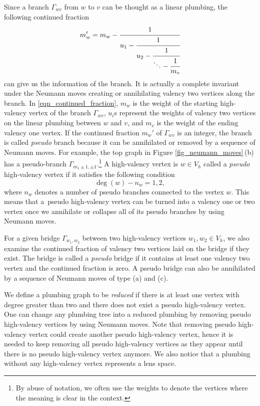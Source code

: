 Since a branch $ \Gamma_{wv} $ from $ w $ to $ v $ can be thought as a linear plumbing, the following continued fraction
\begin{equation}\label{eqn_continued_fraction}
	m_w'=m_w-\cfrac{1}{u_1-\cfrac{1}{u_2-\cfrac{1}{\ddots - \cfrac{1}{m_v}}}}
\end{equation}
can give us the information of the branch. It is actually a complete invariant under the Neumann moves creating or annihilating valency two vertices along the branch. In \eqref{eqn_continued_fraction}, $ m_w $ is the weight of the starting high-valency vertex of the branch $ \Gamma_{wv} $, $ u_i $s represent the weights of valency two vertices on the linear plumbing between $ w $ and $ v $, and $ m_v $ is the weight of the ending valency one vertex. If the continued fraction $ m_w' $ of $ \Gamma_{wv} $ is an integer, the branch is called \textit{pseudo} branch because it can be annihilated or removed by a sequence of Neumann moves. For example, the top graph in Figure \ref{fig_neumann_moves}\,(b) has a pseudo-branch $\Gamma_{m_1\pm1, \pm1}$.\footnote{By abuse of notation, we often use the weights to denote the vertices where the meaning is clear in the context.} A high-valency vertex is $w\in V_h$ called a \textit{pseudo} high-valency vertex if it satisfies the following condition
\[
\deg(w) - n_w = 1, 2,
\]
where $n_w$ denotes a number of pseudo branches connected to the vertex $w$. This means that a~pseudo high-valency vertex can be turned into a valency one or two vertex once we annihilate or collapse all of its pseudo branches by using Neumann moves.

For a given bridge $ \Gamma_{w_1,w_2} $ between two high-valency vertices $ w_1,w_2\in V_h $, we also examine the continued fraction of valency two vertices laid on the bridge if they exist. The bridge is called a \textit{pseudo} bridge if it contains at least one valency two vertex and the continued fraction is zero. A pseudo bridge can also be annihilated by a sequence of Neumann moves of type (a) and (c).

We define a plumbing graph to be \textit{reduced} if there is at least one vertex with degree greater than two and there does not exist a pseudo high-valency vertex. One can change any plumbing tree into a reduced plumbing by removing pseudo high-valency vertices by using Neumann moves. Note that removing pseudo high-valency vertex could create another pseudo high-valency vertex, hence it is needed to keep removing all pseudo high-valency vertices as they appear until there is no pseudo high-valency vertex anymore. We also notice that a plumbing without any high-valency vertex represents a lens space.

